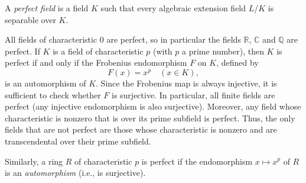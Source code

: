 \documentclass[12pt]{article}
\begin{document}
A \emph{perfect field} is a field $K$ such that every algebraic extension field $L/K$ is separable over $K$.

All fields of characteristic 0 are perfect, so in particular the fields $\mathbb R$, $\mathbb C$ and $\mathbb Q$ are perfect.  If $K$ is a field of characteristic $p$ (with $p$ a prime number), then $K$ is perfect if and only if the Frobenius endomorphism $F$ on $K$, defined by
$$
F(x)=x^p\quad(x\in K),
$$
is an automorphism of $K$.  Since the Frobenius map is always injective, it is sufficient to check whether $F$ is surjective.  In particular, all finite fields are perfect (any injective endomorphism is also surjective).  Moreover, any field whose characteristic is nonzero that is  over its prime subfield is perfect.  Thus, the only fields that are not perfect are those whose characteristic is nonzero and are transcendental over their prime subfield.

Similarly, a ring $R$ of characteristic $p$ is perfect if the endomorphism $x\mapsto x^p$ of $R$ is an {\it automorphism} (i.e., is surjective).
\end{document}
